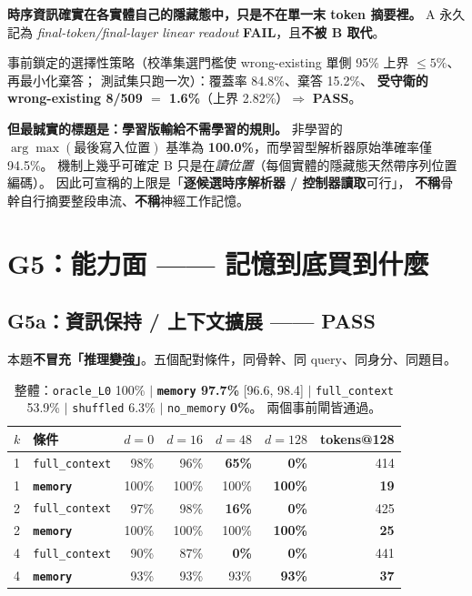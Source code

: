 \documentclass[11pt, a4paper]{article}
\newcommand{\PASS}{\textcolor{green!45!black}{\textbf{PASS}}}
\newcommand{\FAIL}{\textcolor{red!70!black}{\textbf{FAIL}}}
\begin{document}
\textbf{時序資訊確實在各實體自己的隱藏態中，只是不在單一末 token 摘要裡。}
A 永久記為 \emph{final-token/final-layer linear readout} \FAIL{}，且\textbf{不被 B 取代}。

事前鎖定的選擇性策略（校準集選門檻使 wrong-existing 單側 95\% 上界 $\leq 5\%$、再最小化棄答；
測試集只跑一次）：覆蓋率 84.8\%、棄答 15.2\%、
\textbf{受守衛的 wrong-existing 8/509 $=$ 1.6\%}（上界 2.82\%）$\Rightarrow$ \PASS{}。

\textbf{但最誠實的標題是：學習版輸給不需學習的規則。}
非學習的 $\arg\max(\text{最後寫入位置})$ 基準為 \textbf{100.0\%}，而學習型解析器原始準確率僅 94.5\%。
機制上幾乎可確定 B 只是在\emph{讀位置}（每個實體的隱藏態天然帶序列位置編碼）。
因此可宣稱的上限是「\textbf{逐候選時序解析器 / 控制器讀取}可行」，
\textbf{不稱}骨幹自行摘要整段串流、\textbf{不稱}神經工作記憶。

\section{G5：能力面 —— 記憶到底買到什麼}

\subsection{G5a：資訊保持 / 上下文擴展 —— \PASS{}}

本題\textbf{不冒充「推理變強」}。五個配對條件，同骨幹、同 query、同身分、同題目。

\begin{table}[h]
\centering
\small
\begin{tabular}{llrrrrr}
\toprule
$k$ & 條件 & $d{=}0$ & $d{=}16$ & $d{=}48$ & \textbf{$d{=}128$} & tokens@128 \\
\midrule
1 & \verb|full_context| & 98\% & 96\% & \textbf{65\%} & \textbf{0\%} & 414 \\
1 & \textbf{\texttt{memory}} & 100\% & 100\% & 100\% & \textbf{100\%} & \textbf{19} \\
2 & \verb|full_context| & 97\% & 98\% & \textbf{16\%} & \textbf{0\%} & 425 \\
2 & \textbf{\texttt{memory}} & 100\% & 100\% & 100\% & \textbf{100\%} & \textbf{25} \\
4 & \verb|full_context| & 90\% & 87\% & \textbf{0\%} & \textbf{0\%} & 441 \\
4 & \textbf{\texttt{memory}} & 93\% & 93\% & 93\% & \textbf{93\%} & \textbf{37} \\
\bottomrule
\end{tabular}
\caption{整體：\texttt{oracle\_L0} 100\% $\mid$ \textbf{\texttt{memory} 97.7\%} [96.6, 98.4]
$\mid$ \texttt{full\_context} 53.9\% $\mid$ \texttt{shuffled} 6.3\% $\mid$ \texttt{no\_memory} \textbf{0\%}。
兩個事前閘皆通過。}
\end{table}
\end{document}

